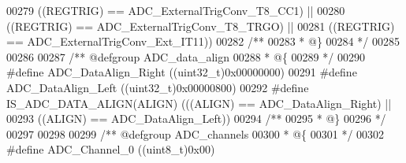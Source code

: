 \begin{DoxyCode}
00279                                   \textcolor{preprocessor}{(}\textcolor{preprocessor}{(}\textcolor{preprocessor}{REGTRIG}\textcolor{preprocessor}{)} \textcolor{preprocessor}{==} ADC_ExternalTrigConv_T8_CC1\textcolor{preprocessor}{)} \textcolor{preprocessor}{||}
00280                                   \textcolor{preprocessor}{(}\textcolor{preprocessor}{(}\textcolor{preprocessor}{REGTRIG}\textcolor{preprocessor}{)} \textcolor{preprocessor}{==} 
      ADC_ExternalTrigConv_T8_TRGO\textcolor{preprocessor}{)} \textcolor{preprocessor}{||}
00281                                   \textcolor{preprocessor}{(}\textcolor{preprocessor}{(}\textcolor{preprocessor}{REGTRIG}\textcolor{preprocessor}{)} \textcolor{preprocessor}{==} 
      ADC_ExternalTrigConv_Ext_IT11\textcolor{preprocessor}{)}\textcolor{preprocessor}{)}
00282 \textcolor{comment}{/**}
00283 \textcolor{comment}{  * @\}}
00284 \textcolor{comment}{  */}
00285 
00286 
00287 \textcolor{comment}{/** @defgroup ADC\_data\_align }
00288 \textcolor{comment}{  * @\{}
00289 \textcolor{comment}{  */}
00290 \textcolor{preprocessor}{#}\textcolor{preprocessor}{define} \textcolor{preprocessor}{ADC\_DataAlign\_Right}                        \textcolor{preprocessor}{(}\textcolor{preprocessor}{(}\textcolor{preprocessor}{uint32\_t}\textcolor{preprocessor}{)}0x00000000\textcolor{preprocessor}{)}
00291 \textcolor{preprocessor}{#}\textcolor{preprocessor}{define} \textcolor{preprocessor}{ADC\_DataAlign\_Left}                         \textcolor{preprocessor}{(}\textcolor{preprocessor}{(}\textcolor{preprocessor}{uint32\_t}\textcolor{preprocessor}{)}0x00000800\textcolor{preprocessor}{)}
00292 \textcolor{preprocessor}{#}\textcolor{preprocessor}{define} \textcolor{preprocessor}{IS\_ADC\_DATA\_ALIGN}\textcolor{preprocessor}{(}\textcolor{preprocessor}{ALIGN}\textcolor{preprocessor}{)} \textcolor{preprocessor}{(}\textcolor{preprocessor}{(}\textcolor{preprocessor}{(}\textcolor{preprocessor}{ALIGN}\textcolor{preprocessor}{)} \textcolor{preprocessor}{==} ADC_DataAlign_Right\textcolor{preprocessor}{)} \textcolor{preprocessor}{||}
00293                                   \textcolor{preprocessor}{(}\textcolor{preprocessor}{(}\textcolor{preprocessor}{ALIGN}\textcolor{preprocessor}{)} \textcolor{preprocessor}{==} ADC_DataAlign_Left\textcolor{preprocessor}{)}\textcolor{preprocessor}{)}
00294 \textcolor{comment}{/**}
00295 \textcolor{comment}{  * @\}}
00296 \textcolor{comment}{  */}
00297 
00298 
00299 \textcolor{comment}{/** @defgroup ADC\_channels }
00300 \textcolor{comment}{  * @\{}
00301 \textcolor{comment}{  */}
00302 \textcolor{preprocessor}{#}\textcolor{preprocessor}{define} \textcolor{preprocessor}{ADC\_Channel\_0}                               \textcolor{preprocessor}{(}\textcolor{preprocessor}{(}\textcolor{preprocessor}{uint8\_t}\textcolor{preprocessor}{)}0x00\textcolor{preprocessor}{)}

\end{DoxyCode}
